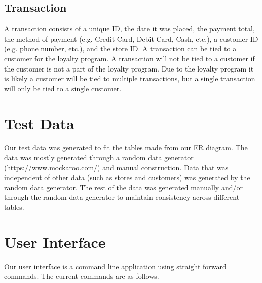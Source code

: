 \documentclass{article}
\begin{document}
		\subsection{Transaction}
			A transaction consists of a unique ID, the date it was placed, the payment
			total, the method of payment (e.g. Credit Card, Debit Card, Cash, etc.), a
			customer ID (e.g. phone number, etc.), and the store ID. A transaction can
			be tied to a customer for the loyalty program. A transaction will not be
			tied to a customer if the customer is not a part of the loyalty program.
			Due to the loyalty program it is likely a customer will be tied to
			multiple transactions, but a single transaction will only be tied to a
			single customer.



	\section{Test Data}
		Our test data was generated to fit the tables made from our ER diagram. The
		data was mostly generated through a random data generator
		(\url{https://www.mockaroo.com/}) and manual construction. Data that was
		independent of other data (such as stores and customers) was generated by
		the random data generator. The rest of the data was generated manually
		and/or through the random data generator to maintain consistency across
		different tables.

	\section{User Interface}
    Our user interface is a command line application using straight forward
    commands. The current commands are as follows.
\end{document}
